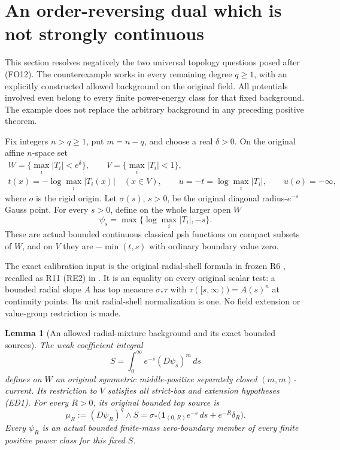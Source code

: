 \documentclass[11pt,a4paper]{article}
\numberwithin{equation}{section}
\newtheorem{lemma}[theorem]{Lemma}
\theoremstyle{definition}
\theoremstyle{remark}
\begin{document}


\section{An order-reversing dual which is not strongly continuous}
\label{sec:r12-radial-pole-order-dual}

This section resolves negatively the two universal topology
questions posed after \textup{(FO12)}.  The counterexample
works in every remaining degree $q\ge1$, with an explicitly
constructed allowed background on the original field.  All
potentials involved even belong to every finite power-energy
class for that fixed background.  The example does not replace
the arbitrary background in any preceding positive theorem.

Fix integers $n>q\ge1$, put $m=n-q$, and choose a real
$\delta>0$.  On the original affine $n$-space set
\[
 \begin{gathered}
 W=\{\max_i|T_i|<e^\delta\},\qquad
 V=\{\max_i|T_i|<1\},\\
 t(x)=-\log\max_i|T_i(x)|\quad(x\in V),\qquad
 u=-t=\log\max_i|T_i|,\qquad u(o)=-\infty,
 \end{gathered}
 \tag{PO1}
\]
where $o$ is the rigid origin.  Let $\sigma(s)$, $s>0$,
be the original diagonal radius-$e^{-s}$ Gauss point.  For
every $s>0$, define on the whole larger open $W$
\[
             \psi_s=\max\{\log\max_i|T_i|,-s\}.
 \tag{PO2}
\]
These are actual bounded continuous classical psh functions
on compact subsets of $W$, and on $V$ they are
$-\min(t,s)$ with ordinary boundary value zero.

The exact calibration input is the original radial-shell
formula in frozen R6
, recalled
as R11 \textup{(RE2)} in
.
It is an equality on every original scalar test: a bounded
radial slope $A$ has top measure $\sigma_*\tau$ with
$\tau([s,\infty))=A(s)^n$ at continuity points.  Its unit
radial-shell normalization is one.  No field extension or
value-group restriction is made.

\begin{lemma}[An allowed radial-mixture background and its exact bounded sources]
\label{lem:r12-radial-mixture-background}
The weak coefficient integral
\[
                    S=\int_0^\infty e^{-s}(D\psi_s)^m\,ds
 \tag{PO3}
\]
defines on $W$ an original symmetric middle-positive
separately closed $(m,m)$-current.  Its restriction to $V$
satisfies all strict-box and extension hypotheses
\textup{(ED1)}.  For every $R>0$, its original bounded
top source is
\[
 \mu_R:=(D\psi_R)^q\wedge S
     =\sigma_*\bigl(\mathbf1_{(0,R)}e^{-s}\,ds
                                         +e^{-R}\delta_R\bigr).
 \tag{PO4}
\]
Every $\psi_R$ is an actual bounded finite-mass
zero-boundary member of every finite positive power class
for this fixed $S$.
\end{lemma}
\end{document}
